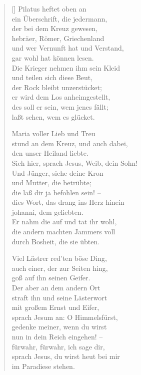 \begin{multicols}{2}
\begin{verse}[\versewidth]
 Pilatus heftet oben an\\
ein Überschrift, die jedermann,\\
der bei dem Kreuz gewesen,\\
hebräer, Römer, Griechenland\\
und wer Vernunft hat und Verstand,\\
gar wohl hat können lesen.\\
Die Krieger nehmen ihm sein Kleid\\
und teilen sich diese Beut,\\
der Rock bleibt unzerstücket;\\
er wird dem Los anheimgestellt,\\
des soll er sein, wem jenes fällt;\\
laßt sehen, wem es glücket.

 Maria voller Lieb und Treu\\
stund an dem Kreuz, und auch dabei,\\
den unser Heiland liebte.\\
Sieh hier, sprach Jesus, Weib, dein Sohn!\\
Und Jünger, siehe deine Kron\\
und Mutter, die betrübte;\\
die laß dir ja befohlen sein! –\\
dies Wort, das drang ins Herz hinein\\
johanni, dem geliebten.\\
Er nahm die auf und tat ihr wohl,\\
die andern machten Jammers voll\\
durch Bosheit, die sie übten.

 Viel Lästrer red'ten böse Ding,\\
auch einer, der zur Seiten hing,\\
goß auf ihn seinen Geifer.\\
Der aber an dem andern Ort\\
straft ihn und seine Lästerwort\\
mit großem Ernst und Eifer,\\
sprach Jesum an: O Himmelsfürst,\\
gedenke meiner, wenn du wirst\\
nun in dein Reich eingehen! –\\
fürwahr, fürwahr, ich sage dir,\\
sprach Jesus, du wirst heut bei mir\\
im Paradiese stehen.


\end{verse}
\end{multicols}
